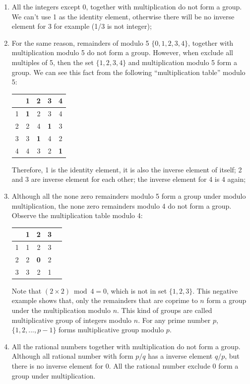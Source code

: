 \documentclass{article}
\begin{document}
\begin{enumerate}
\item All the integers except 0, together with multiplication do not form a group. We can't use 1 as the identity element, otherwise there will be no inverse element for 3 for example (1/3 is not integer);

\item For the same reason, remainders of modulo 5 $\{0, 1, 2, 3, 4\}$, together with multiplication modulo 5 do not form a group. However, when exclude all multiples of 5, then the set $\{1, 2, 3, 4\}$ and multiplication modulo 5 form a group. We can see this fact from the following ``multiplication table'' modulo 5:

\vspace{5mm}
  \begin{tabular}{c|cccc}
    & 1 & 2 & 3 & 4 \\
  \hline
  1 & \textbf{1} & 2 & 3 & 4 \\
  2 & 2 & 4 & \textbf{1} & 3 \\
  3 & 3 & \textbf{1} & 4 & 2 \\
  4 & 4 & 3 & 2 & \textbf{1}
  \end{tabular}
\vspace{5mm}

Therefore, 1 is the identity element, it is also the inverse element of itself; 2 and 3 are inverse element for each other; the inverse element for 4 is 4 again;

\item Although all the none zero remainders modulo 5 form a group under modulo multiplication, the none zero remainders modulo 4 do not form a group. Observe the multiplication table modulo 4:

\vspace{5mm}
  \begin{tabular}{c|cccc}
    & 1 & 2 & 3 \\
  \hline
  1 & 1 & 2 & 3 \\
  2 & 2 & \textbf{0} & 2 \\
  3 & 3 & 2 & 1 \\
  \end{tabular}
\vspace{5mm}

Note that $(2 \times 2) \bmod 4 = 0$, which is not in set $\{1, 2, 3\}$. This negative example shows that, only the remainders that are coprime to $n$ form a group under the multiplication modulo $n$. This kind of groups are called multiplicative group of integers modulo $n$. For any prime number $p$, $\{1, 2, ..., p-1\}$ forms multiplicative group modulo $p$.

\item All the rational numbers together with multiplication do not form a group. Although all rational number with form $p/q$ has a inverse element $q/p$, but there is no inverse element for 0. All the rational number exclude 0 form a group under multiplication.
\end{enumerate}
\end{document}
